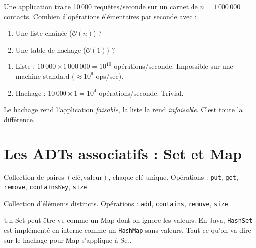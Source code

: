 \documentclass[11pt,a4paper]{article}
\newcommand{\bigO}{\mathcal{O}}
\begin{document}
\begin{appliboxQ}
Une application traite 10\,000 requêtes/seconde sur un carnet de $n = 1\,000\,000$ contacts. Combien d'opérations élémentaires par seconde avec :
\begin{enumerate}[nosep]
    \item Une liste chaînée ($\bigO(n)$) ?
    \item Une table de hachage ($\bigO(1)$) ?
\end{enumerate}
\end{appliboxQ}

\begin{appliboxR}[Réponse]
\begin{enumerate}[nosep]
    \item Liste : $10\,000 \times 1\,000\,000 = 10^{10}$ opérations/seconde. Impossible sur une machine standard ($\approx 10^9$ ops/sec).
    \item Hachage : $10\,000 \times 1 = 10^{4}$ opérations/seconde. Trivial.
\end{enumerate}
Le hachage rend l'application \emph{faisable}, la liste la rend \emph{infaisable}. C'est toute la différence.
\end{appliboxR}

\section{Les ADTs associatifs : Set et Map}

\begin{infobox}
Collection de paires $(\text{clé}, \text{valeur})$, chaque clé unique. Opérations : \texttt{put}, \texttt{get}, \texttt{remove}, \texttt{containsKey}, \texttt{size}.
\end{infobox}

\begin{infobox}
Collection d'éléments distincts. Opérations : \texttt{add}, \texttt{contains}, \texttt{remove}, \texttt{size}.
\end{infobox}

\begin{retenirbox}
Un Set peut être vu comme un Map dont on ignore les valeurs. En Java, \texttt{HashSet} est implémenté en interne comme un \texttt{HashMap} sans valeurs. Tout ce qu'on va dire sur le hachage pour Map s'applique à Set.
\end{retenirbox}
\end{document}
